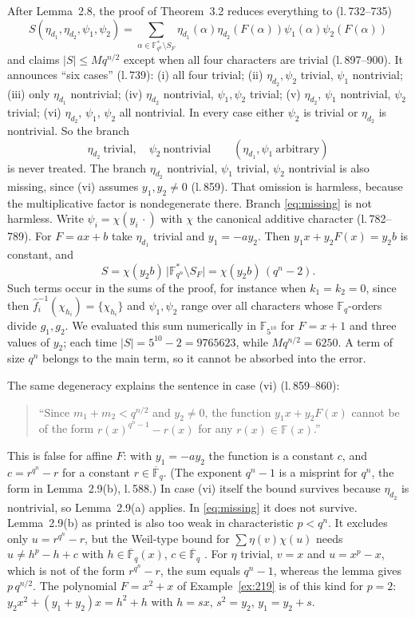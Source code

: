 \documentclass[11pt,a4paper]{amsart}
\theoremstyle{remark}
\newcommand{\F}{\mathbb{F}}
\newcommand{\Fq}{\mathbb{F}_q}
\newcommand{\Fqn}{\mathbb{F}_{q^n}}
\begin{document}
After Lemma~2.8, the proof of Theorem~3.2 reduces everything to (l.\,732--735)
\[
S(\eta_{d_1},\eta_{d_2},\psi_1,\psi_2)=\sum_{\alpha\in\Fqn^*\setminus S_F}\eta_{d_1}(\alpha)\eta_{d_2}(F(\alpha))
\psi_1(\alpha)\psi_2(F(\alpha))
\]
and claims $|S|\le Mq^{n/2}$ except when all four characters are
trivial (l.\,897--900). It announces ``six cases'' (l.\,739):
(i) all four trivial; (ii) $\eta_{d_2},\psi_2$ trivial, $\psi_1$ nontrivial; (iii) only $\eta_{d_1}$ nontrivial;
(iv) $\eta_{d_2}$ nontrivial, $\psi_1,\psi_2$ trivial; (v) $\eta_{d_2}$, $\psi_1$ nontrivial, $\psi_2$ trivial;
(vi) $\eta_{d_2}$, $\psi_1$, $\psi_2$ all nontrivial. In every case either $\psi_2$ is trivial or $\eta_{d_2}$ is
nontrivial. So the branch
\begin{equation}\label{eq:missing}
\eta_{d_2}\ \text{trivial},\quad \psi_2\ \text{nontrivial}\qquad(\eta_{d_1},\psi_1\ \text{arbitrary})
\end{equation}
is never treated. The branch $\eta_{d_2}$ nontrivial, $\psi_1$ trivial, $\psi_2$ nontrivial is also missing,
since (vi) assumes $y_1,y_2\ne0$ (l.\,859). That omission is harmless, because the multiplicative factor is
nondegenerate there. Branch \eqref{eq:missing} is not harmless. Write $\psi_i=\chi(y_i\,\cdot)$ with $\chi$ the
canonical additive character (l.\,782--789). For $F=ax+b$ take $\eta_{d_1}$ trivial and $y_1=-ay_2$. Then
$y_1x+y_2F(x)=y_2b$ is constant, and
\[
S=\chi(y_2b)\,\bigl|\Fqn^*\setminus S_F\bigr|=\chi(y_2b)\,(q^n-2).
\]
Such terms occur in the sums of the proof, for instance when $k_1=k_2=0$, since then $\hat f_i^{-1}(\chi_{h_i})=\{\chi_{h_i}\}$
and $\psi_1,\psi_2$ range over all characters whose $\Fq$-orders divide $g_1,g_2$. We evaluated this sum numerically
in $\F_{5^{10}}$ for $F=x+1$ and three values of $y_2$; each time $|S|=5^{10}-2=9765623$, while
$Mq^{n/2}=6250$. A term of size $q^n$ belongs to the main term, so it cannot be absorbed into the error.

The same degeneracy explains the sentence in case (vi) (l.\,859--860):
\begin{quote}\small
``Since $m_1+m_2<q^{n/2}$ and $y_2\neq0$, the function $y_1x+y_2F(x)$ cannot be of the form $r(x)^{q^n-1}-r(x)$ for
any $r(x)\in\F(x)$.''
\end{quote}
This is false for affine $F$: with $y_1=-ay_2$ the function is a constant $c$, and $c=r^{q^n}-r$ for a constant
$r\in\overline{\F}_q$. (The exponent $q^n-1$ is a misprint for $q^n$, the form in Lemma~2.9(b), l.\,588.) In case
(vi) itself the bound survives because $\eta_{d_2}$ is nontrivial, so Lemma~2.9(a) applies. In \eqref{eq:missing} it
does not survive. Lemma~2.9(b) as printed is also too weak in characteristic $p<q^n$. It excludes only
$u=r^{q^n}-r$, but the Weil-type bound for $\sum\eta(v)\chi(u)$ needs $u\ne h^p-h+c$ with $h\in\overline{\F}_q(x)$,
$c\in\overline{\F}_q$ \cite{CM}. For $\eta$ trivial, $v=x$ and $u=x^p-x$, which is not of the form $r^{q^n}-r$, the sum
equals $q^n-1$, whereas the lemma gives $p\,q^{n/2}$. The polynomial $F=x^2+x$ of Example~\ref{ex:219} is of this
kind for $p=2$: $y_2x^2+(y_1+y_2)x=h^2+h$ with $h=sx$, $s^2=y_2$, $y_1=y_2+s$.
\end{document}
